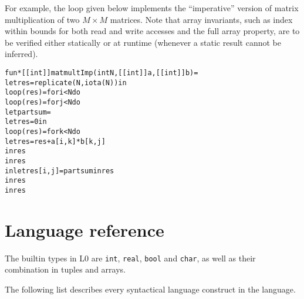 \documentclass[oneside]{memoir}
\newcommand\boolt[0]{\texttt{bool}}
\newcommand\realt[0]{\texttt{real}}
\newcommand\chart[0]{\texttt{char}}
\newcommand\intt[0]{\texttt{int}}
\begin{document}
For example, the loop given below implements the ``imperative'' version of
matrix multiplication of two $M\times M$ matrices.
%
Note that array invariants, such as index within bounds for both 
read and write accesses and the full array property, are to be verified 
either statically or at runtime (whenever a static result cannot be inferred).

\begin{alltt}
fun *[[int]] matmultImp(int N, [[int]] a, [[int]] b) =
    let res = replicate(N, iota(N)) in
    loop (res) = for i < N do
        loop (res) = for j < N do
            let partsum = 
                let res = 0 in
                loop (res) = for k < N do
                    let res = res + a[i,k] * b[k,j]
                    in  res
                in res
            in let res[i,j] = partsum in res
        in res
    in res
\end{alltt}


\section{Language reference}
\label{sec:l0-reference}

The builtin types in L0 are \intt{}, \realt{}, \boolt{} and \chart{}, as
well as their combination in tuples and arrays.

The following list describes every syntactical language construct in
the language.
\end{document}
